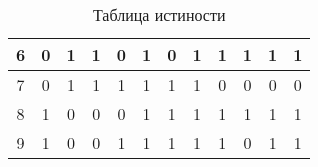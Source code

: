 \begin{table}[]
\begin{tabular}{|c|cccc|ccccccc|}
6                      & \multicolumn{1}{c|}{0}  & \multicolumn{1}{c|}{1}  & \multicolumn{1}{c|}{1}  & 0  & \multicolumn{1}{c|}{1} & \multicolumn{1}{c|}{0} & \multicolumn{1}{c|}{1} & \multicolumn{1}{c|}{1} & \multicolumn{1}{c|}{1} & \multicolumn{1}{c|}{1} & 1 \\ \hline
7                      & \multicolumn{1}{c|}{0}  & \multicolumn{1}{c|}{1}  & \multicolumn{1}{c|}{1}  & 1  & \multicolumn{1}{c|}{1} & \multicolumn{1}{c|}{1} & \multicolumn{1}{c|}{1} & \multicolumn{1}{c|}{0} & \multicolumn{1}{c|}{0} & \multicolumn{1}{c|}{0} & 0 \\ \hline
8                      & \multicolumn{1}{c|}{1}  & \multicolumn{1}{c|}{0}  & \multicolumn{1}{c|}{0}  & 0  & \multicolumn{1}{c|}{1} & \multicolumn{1}{c|}{1} & \multicolumn{1}{c|}{1} & \multicolumn{1}{c|}{1} & \multicolumn{1}{c|}{1} & \multicolumn{1}{c|}{1} & 1 \\ \hline
9                      & \multicolumn{1}{c|}{1}  & \multicolumn{1}{c|}{0}  & \multicolumn{1}{c|}{0}  & 1  & \multicolumn{1}{c|}{1} & \multicolumn{1}{c|}{1} & \multicolumn{1}{c|}{1} & \multicolumn{1}{c|}{1} & \multicolumn{1}{c|}{0} & \multicolumn{1}{c|}{1} & 1 \\ \hline
\end{tabular}
\caption{Таблица истиности}
\label{table:logic_table}
\end{table}